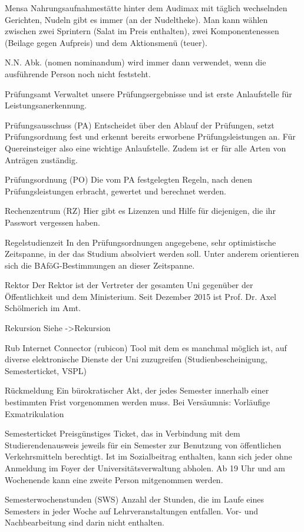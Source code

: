 Mensa
Nahrungsaufnahmestätte hinter dem Audimax mit täglich wechselnden Gerichten, Nudeln gibt es immer (an der Nudeltheke). Man kann wählen zwischen zwei Sprintern (Salat im Preis enthalten), zwei Komponentenessen (Beilage gegen Aufpreis) und dem Aktionsmenü (teuer).

N.N.
Abk. (nomen nominandum) wird immer dann verwendet, wenn die ausführende Person noch nicht feststeht.

Prüfungsamt
Verwaltet unsere Prüfungsergebnisse und ist erste Anlaufstelle für Leistungsanerkennung.

Prüfungsausschuss (PA)
Entscheidet über den Ablauf der Prüfungen, setzt Prüfungsordnung fest und erkennt bereits erworbene Prüfungsleistungen an. Für Quereinsteiger also eine wichtige Anlaufstelle. Zudem ist er für alle Arten von Anträgen zuständig.

Prüfungsordnung (PO)
Die vom PA festgelegten Regeln, nach denen Prüfungsleistungen erbracht, gewertet und berechnet werden.

Rechenzentrum (RZ)
Hier gibt es Lizenzen und Hilfe für diejenigen, die ihr Passwort vergessen haben.

Regelstudienzeit
In den Prüfungsordnungen angegebene, sehr optimistische Zeitspanne, in der das Studium absolviert werden soll. Unter anderem orientieren sich die BAföG-Bestimmungen an dieser Zeitspanne.

Rektor
Der Rektor ist der Vertreter der gesamten Uni gegenüber der Öffentlichkeit und dem Ministerium. Seit Dezember 2015 ist Prof. Dr. Axel Schölmerich im Amt.

Rekursion
Siehe ->Rekursion

Rub Internet Connector (rubicon)
Tool mit dem es manchmal möglich ist, auf diverse elektronische Dienste der Uni zuzugreifen (Studienbescheinigung, Semesterticket, VSPL)

Rückmeldung
Ein bürokratischer Akt, der jedes Semester innerhalb einer bestimmten Frist vorgenommen werden muss. Bei Versäumnis: Vorläufige Exmatrikulation

Semesterticket
Preisgünstiges Ticket, das in Verbindung mit dem Studierendenausweis jeweils für ein Semester zur Benutzung von öffentlichen Verkehrsmitteln berechtigt. Ist im Sozialbeitrag enthalten, kann sich jeder ohne Anmeldung im Foyer der Universitätsverwaltung abholen. Ab 19 Uhr und am Wochenende kann eine zweite Person mitgenommen werden.

Semesterwochenstunden (SWS)
Anzahl der Stunden, die im Laufe eines Semesters in jeder Woche auf Lehrveranstaltungen entfallen. Vor- und Nachbearbeitung sind darin nicht enthalten.

